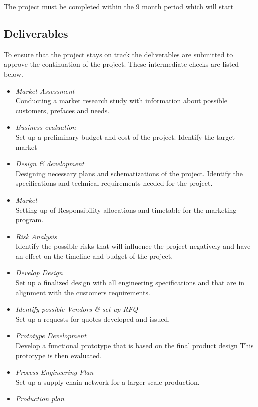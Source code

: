 \noindent
The project must be completed within the 9 month period which will start

\subsection{Deliverables}

To ensure that the project stays on track the deliverables are submitted to approve the continuation of the project. These intermediate checks are listed below.

\begin{itemize}
\item \emph{Market Assessment}\\
Conducting a market research study with information about possible customers, prefaces and needs.
\item \emph{Business evaluation}\\
Set up a preliminary budget and cost of the project. Identify the target market
\item \emph{Design \& development}\\
Designing necessary plans and schematizations of the project. Identify the specifications and technical requirements needed for the project.
\item \emph{Market}\\
Setting up of Responsibility allocations and timetable for the marketing program.
\item \emph{Risk Analysis}\\
Identify the possible risks that will influence the project negatively and have an effect on the timeline and budget of the project.
\item \emph{Develop Design}\\
Set up a finalized design with all engineering specifications and that are in alignment with the customers requirements.
\item \emph{Identify possible Vendors \& set up RFQ}\\
Set up a requests for quotes developed and issued.
\item \emph{Prototype Development}\\
Develop a functional prototype that is based on the final product design This prototype is then evaluated.
\item \emph{Process Engineering Plan}\\
Set up a supply chain network for a larger scale production.
\item \emph{Production plan}\\

\end{itemize}
